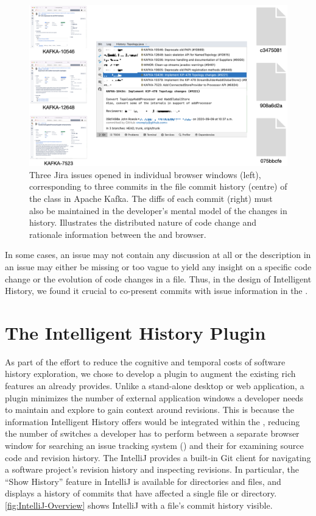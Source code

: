 \begin{figure}
    \center
    \includegraphics[width=\textwidth]{./images/cognitive-load.png}
    \caption{
        Three Jira issues opened in individual browser windows (left), corresponding to three commits in the file commit history (centre) of the  class in Apache Kafka. 
        The diffs of each commit (right) must also be maintained in the developer's mental model of the changes in history. 
        Illustrates the distributed nature of code change and rationale information between the  and browser.
    }
    \label{fig:Cognitive-Load}
\end{figure}

In some cases, an issue may not contain any discussion at all or the description in an issue may either be missing or too vague to yield any insight on a specific code change or the evolution of code changes in a file.
Thus, in the design of Intelligent History, we found it crucial to co-present commits with issue information in the .

\section{The Intelligent History Plugin}
\label{sec:Implementation}

As part of the effort to reduce the cognitive and temporal costs of software history exploration, we chose to develop a plugin to augment the existing rich features an  already provides.
Unlike a stand-alone desktop or web application, a plugin minimizes the number of external application windows a developer needs to maintain and explore to gain context around revisions. 
This is because the information Intelligent History offers would be integrated within the , reducing the number of switches a developer has to perform between a separate browser window for searching an issue tracking system () and their  for examining source code and revision history.
The IntelliJ  provides a built-in Git client  for navigating a software project's revision history and inspecting revisions. 
In particular, the ``Show History'' feature in IntelliJ is available for directories and files, and displays a history of commits that have affected a single file or directory.
\autoref{fig:IntelliJ-Overview} shows IntelliJ with a file's commit history visible.

